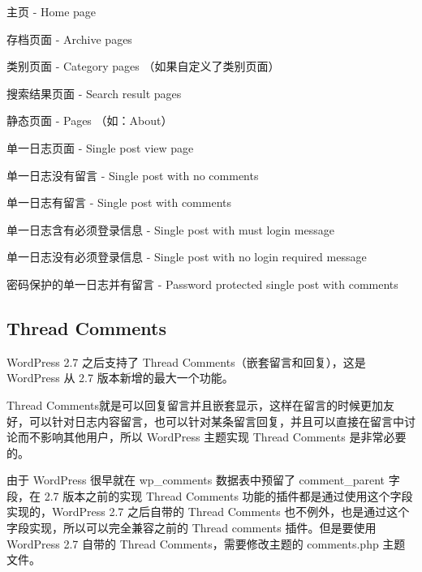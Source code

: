 \begin{compactitem}
\item 主页 - Home page

\item 存档页面 - Archive pages

\item 类别页面 - Category pages （如果自定义了类别页面）

\item 搜索结果页面 - Search result pages

\item 静态页面 - Pages （如：About）

\item 单一日志页面 - Single post view page

\item 单一日志没有留言 - Single post with no comments

\item 单一日志有留言 - Single post with comments

\item 单一日志含有必须登录信息 - Single post with must login message

\item 单一日志没有必须登录信息 - Single post with no login required message

\item 密码保护的单一日志并有留言 - Password protected single post with comments

\end{compactitem}

\subsection{Thread Comments}


WordPress 2.7 之后支持了 Thread Comments（嵌套留言和回复），这是WordPress 从 2.7 版本新增的最大一个功能。

Thread Comments就是可以回复留言并且嵌套显示，这样在留言的时候更加友好，可以针对日志内容留言，也可以针对某条留言回复，并且可以直接在留言中讨论而不影响其他用户，所以 WordPress 主题实现 Thread Comments 是非常必要的。

由于 WordPress 很早就在 wp\_comments 数据表中预留了 comment\_parent 字段，在 2.7 版本之前的实现 Thread Comments 功能的插件都是通过使用这个字段实现的，WordPress 2.7 之后自带的 Thread Comments 也不例外，也是通过这个字段实现，所以可以完全兼容之前的 Thread comments 插件。但是要使用 WordPress 2.7 自带的 Thread Comments，需要修改主题的 comments.php 主题文件。






\clearpage

